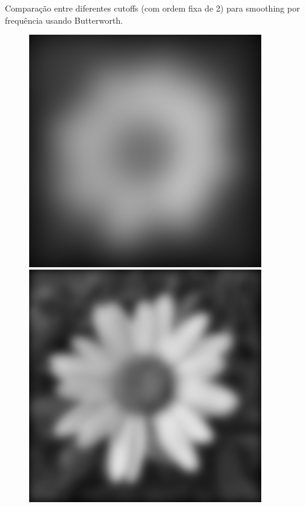\documentclass[a4paper]{report}
\begin{document}
Comparação entre diferentes cutoffs (com ordem fixa de 2) para smoothing por frequência usando Butterworth.
\begin{figure}[H]
\centering
\begin{minipage}{.3\textwidth}
  \centering
    \includegraphics[width=0.9\textwidth]{images/Smooth/frequency-gaussian/flower_smooth_frequency_Butterworth_2_5.png}
\end{minipage}%
\begin{minipage}{.3\textwidth}
  \centering
    \includegraphics[width=0.9\textwidth]{images/Smooth/frequency-gaussian/flower_smooth_frequency_Butterworth_2_20.png}

\end{minipage}
\end{figure}
\end{document}
